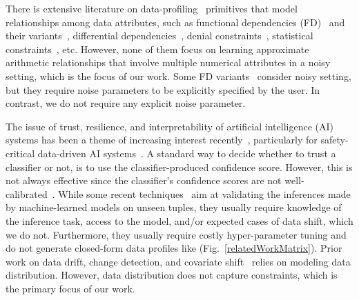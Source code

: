 
There is extensive literature on
data-profiling~\cite{DBLP:journals/vldb/AbedjanGN15} primitives that model
relationships among data attributes, such as functional dependencies
(FD)~\cite{papenbrock2015functional, DBLP:conf/sigmod/ZhangGR20} and their
variants~\cite{koudas2009metric, DBLP:conf/icde/FanGLX09,
DBLP:conf/sigmod/IlyasMHBA04, huhtala1999tane, kruse2018efficient,
caruccio2016discovery, qahtan2020pattern}, differential
dependencies~\cite{song2011differential}, denial
constraints~\cite{DBLP:journals/pvldb/ChuIP13,
DBLP:journals/corr/abs-2005-08540, DBLP:journals/pvldb/BleifussKN17,
pena2019discovery}, statistical constraints~\cite{DBLP:conf/sigmod/YanSZWC20},
etc. However, none of them focus on learning approximate arithmetic
relationships that involve multiple numerical attributes in a noisy setting,
which is the focus of our work. Some FD
variants~\cite{DBLP:conf/sigmod/IlyasMHBA04, koudas2009metric, huhtala1999tane,
kruse2018efficient, caruccio2016discovery} consider noisy setting, but they
require noise parameters to be explicitly specified by the user. In contrast,
we do not require any explicit noise parameter.


The issue of trust, resilience, and interpretability of artificial intelligence
(AI) systems has been a theme of increasing interest
recently~\cite{DBLP:conf/cav/Jha19, DBLP:journals/crossroads/Varshney19,
DBLP:journals/corr/abs-1904-07204, DBLP:conf/mlsys/KangRBZ20}, particularly for
safety-critical data-driven AI systems~\cite{DBLP:journals/bigdata/VarshneyA17,
DBLP:conf/hicons/TiwariDJCLRSS14}. A standard way to decide whether to trust a
classifier or not, is to use the classifier-produced confidence score. However,
this is not always effective since the classifier's confidence scores are not
well-calibrated~\cite{DBLP:conf/nips/JiangKGG18}. While some recent
techniques~\cite{DBLP:conf/nips/JiangKGG18, DBLP:conf/sigmod/SchelterRB20,
DBLP:journals/corr/HendrycksG16c, DBLP:journals/corr/abs-1812-02765} aim at
validating the inferences made by machine-learned models on unseen tuples, they
usually require knowledge of the inference task, access to the model, and/or
expected cases of data shift, which we do not. Furthermore, they usually
require costly hyper-parameter tuning and do not generate closed-form data
profiles like \dis (Fig.~\ref{relatedWorkMatrix}). Prior work on data drift,
change detection, and covariate shift~\cite{DBLP:conf/sigmod/Aggarwal03,
DBLP:journals/tnn/BuAZ18, dasu2006information, DBLP:journals/eswa/MelloVFB19,
DBLP:conf/kdd/ReisFMB16, DBLP:journals/inffus/FaithfullDK19,
DBLP:conf/icml/Ho05, hooi2019branch, DBLP:conf/sdm/KawaharaS09,
DBLP:conf/vldb/KiferBG04, DBLP:journals/eswa/SethiK17, DBLP:conf/kdd/SongWJR07,
DBLP:conf/sac/IencoBPP14, DBLP:conf/cbms/TsymbalPCP06,
DBLP:journals/corr/WangA15, DBLP:conf/sbia/GamaMCR04, DBLP:conf/sdm/BifetG07,
gaber2006classification, DBLP:journals/tnn/RutkowskiJPD15,
DBLP:conf/iri/SethiKA16} relies on modeling data distribution. However, data
distribution does not capture constraints, which is the primary focus of our
work.


